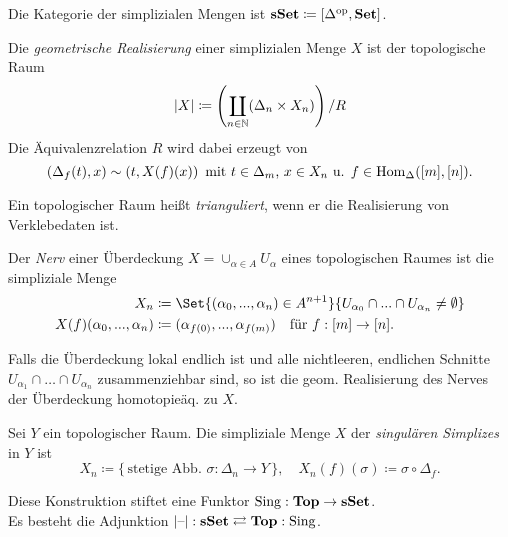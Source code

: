 \documentclass{cheat-sheet}
\DeclareMathOperator{\Sing}{Sing} %
\begin{document}
\begin{defn}
  Die Kategorie der simplizialen Mengen ist $\mathbf{sSet} \coloneqq [\Delta^{\mathrm{op}}, \mathbf{Set}]$.
\end{defn}

\begin{defn}
  Die \emph{geometrische Realisierung} einer simplizialen Menge $X$ ist der topologische Raum
  \[ \lvert X\rvert \coloneqq \left( \coprod_{n \in \mathbb{N}} (\Delta_n \times X_{n}) \right) / R \]
  Die Äquivalenzrelation $R$ wird dabei erzeugt von
  \[
    (\Delta_f(t), x) \sim (t, X(f)(x)) \enspace
    \text{mit $t \in \Delta_m$, $x \in X_n$ u. $f \in \operatorname{Hom}_\Delta([m], [n])$.}
  \]
\end{defn}

\begin{defn}
  Ein topologischer Raum heißt \emph{trianguliert}, wenn er die Realisierung von Verklebedaten ist.
\end{defn}

\begin{defn}
  Der \emph{Nerv} einer Überdeckung $X = \cup_{\alpha \in A} U_\alpha$ eines topologischen Raumes ist die simpliziale Menge
  \begin{align*}
    X_n & \coloneqq \Set{(\alpha_0, \nldots, \alpha_n) \in A^{n+1}}{ U_{\alpha_0} \cap \nldots \cap U_{\alpha_n} \not= \emptyset } \\
    X(f)(\alpha_0, \nldots, \alpha_n) & \coloneqq (\alpha_{f(0)}, \nldots, \alpha_{f(m)}) \quad \text{für } f : [m] \to [n].
  \end{align*}
\end{defn}

\begin{bem}
  Falls die Überdeckung lokal endlich ist und alle nichtleeren, endlichen Schnitte $U_{\alpha_1} \cap \ldots \cap U_{\alpha_n}$ zusammenziehbar sind, so ist die geom. Realisierung des Nerves der Überdeckung homotopieäq. zu $X$.
\end{bem}

\begin{defn}
  Sei $Y$ ein topologischer Raum. Die simpliziale Menge $X$ der \emph{singulären Simplizes} in $Y$ ist
  \[
    X_n \coloneqq \{ \, \text{stetige Abb. } \sigma : \Delta_n \to Y \, \}, \quad
    X_n(f)(\sigma) \coloneqq \sigma \circ \Delta_f.
  \]
\end{defn}

\begin{bem}
  Diese Konstruktion stiftet eine Funktor $\Sing : \Top \to \sSet$. \\
  Es besteht die Adjunktion \enspace $\abs{\blank} : \sSet \rightleftarrows \Top : \Sing$.
\end{bem}
\end{document}
